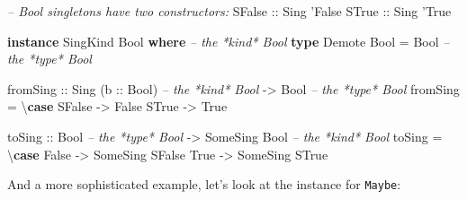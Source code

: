 \documentclass[]{article}
\newenvironment{Shaded}{}{}
\newcommand{\KeywordTok}[1]{\textcolor[rgb]{0.00,0.44,0.13}{\textbf{#1}}}
\newcommand{\DataTypeTok}[1]{\textcolor[rgb]{0.56,0.13,0.00}{#1}}
\newcommand{\CharTok}[1]{\textcolor[rgb]{0.25,0.44,0.63}{#1}}
\newcommand{\CommentTok}[1]{\textcolor[rgb]{0.38,0.63,0.69}{\textit{#1}}}
\newcommand{\OtherTok}[1]{\textcolor[rgb]{0.00,0.44,0.13}{#1}}
\newcommand{\FunctionTok}[1]{\textcolor[rgb]{0.02,0.16,0.49}{#1}}
\newcommand{\NormalTok}[1]{#1}
\begin{document}
\begin{Shaded}
\begin{Highlighting}[]
\CommentTok{-- Bool singletons have two constructors:}
\DataTypeTok{SFalse}\OtherTok{ ::} \DataTypeTok{Sing} \CharTok{'False}
\DataTypeTok{STrue}\OtherTok{  ::} \DataTypeTok{Sing} \CharTok{'True}

\KeywordTok{instance} \DataTypeTok{SingKind} \DataTypeTok{Bool} \KeywordTok{where}    \CommentTok{-- the *kind* Bool}
    \KeywordTok{type} \DataTypeTok{Demote} \DataTypeTok{Bool} \FunctionTok{=} \DataTypeTok{Bool}     \CommentTok{-- the *type* Bool}

\NormalTok{    fromSing}
\OtherTok{        ::} \DataTypeTok{Sing}\NormalTok{ (}\OtherTok{b ::} \DataTypeTok{Bool}\NormalTok{)        }\CommentTok{-- the *kind* Bool}
        \OtherTok{->} \DataTypeTok{Bool}                    \CommentTok{-- the *type* Bool}
\NormalTok{    fromSing }\FunctionTok{=}\NormalTok{ \textbackslash{}}\KeywordTok{case}
        \DataTypeTok{SFalse} \OtherTok{->} \DataTypeTok{False}
        \DataTypeTok{STrue}  \OtherTok{->} \DataTypeTok{True}

\NormalTok{    toSing}
\OtherTok{        ::} \DataTypeTok{Bool}                    \CommentTok{-- the *type* Bool}
        \OtherTok{->} \DataTypeTok{SomeSing} \DataTypeTok{Bool}           \CommentTok{-- the *kind* Bool}
\NormalTok{    toSing }\FunctionTok{=}\NormalTok{ \textbackslash{}}\KeywordTok{case}
        \DataTypeTok{False} \OtherTok{->} \DataTypeTok{SomeSing} \DataTypeTok{SFalse}
        \DataTypeTok{True}  \OtherTok{->} \DataTypeTok{SomeSing} \DataTypeTok{STrue}
\end{Highlighting}
\end{Shaded}

And a more sophisticated example, let's look at the instance for \texttt{Maybe}:
\end{document}
